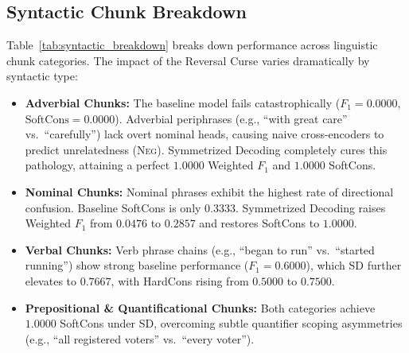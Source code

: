 \documentclass[11pt,a4paper,twocolumn]{article}
\begin{document}
\subsection{Syntactic Chunk Breakdown}
Table~\ref{tab:syntactic_breakdown} breaks down performance across linguistic chunk categories. The impact of the Reversal Curse varies dramatically by syntactic type:
\begin{itemize}
    \item \textbf{Adverbial Chunks:} The baseline model fails catastrophically ($F_1 = 0.0000$, $\text{SoftCons} = 0.0000$). Adverbial periphrases (e.g., ``with great care'' vs.\ ``carefully'') lack overt nominal heads, causing naive cross-encoders to predict unrelatedness (\textsc{Neg}). Symmetrized Decoding completely cures this pathology, attaining a perfect $1.0000$ Weighted $F_1$ and $1.0000$ SoftCons.
    \item \textbf{Nominal Chunks:} Nominal phrases exhibit the highest rate of directional confusion. Baseline SoftCons is only $0.3333$. Symmetrized Decoding raises Weighted $F_1$ from $0.0476$ to $0.2857$ and restores SoftCons to $1.0000$.
    \item \textbf{Verbal Chunks:} Verb phrase chains (e.g., ``began to run'' vs.\ ``started running'') show strong baseline performance ($F_1 = 0.6000$), which SD further elevates to $0.7667$, with HardCons rising from $0.5000$ to $0.7500$.
    \item \textbf{Prepositional \& Quantificational Chunks:} Both categories achieve $1.0000$ SoftCons under SD, overcoming subtle quantifier scoping asymmetries (e.g., ``all registered voters'' vs.\ ``every voter'').
\end{itemize}
\end{document}
